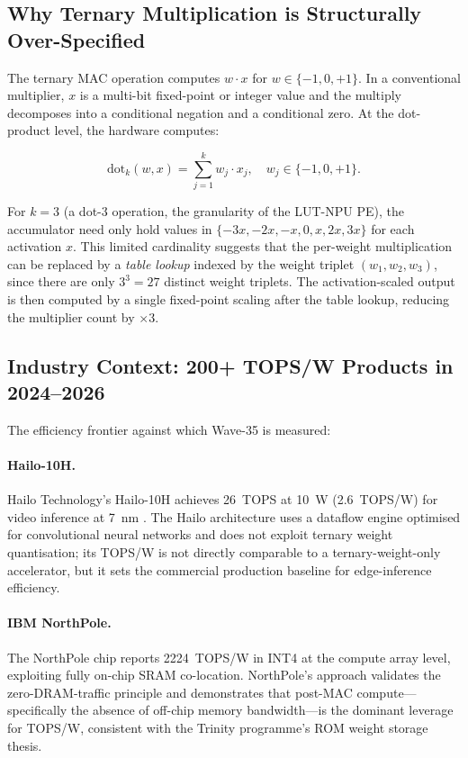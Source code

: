 \subsection{Why Ternary Multiplication is Structurally Over-Specified}

The ternary MAC operation computes $w \cdot x$ for $w \in \{-1,0,+1\}$.
In a conventional multiplier, $x$ is a multi-bit fixed-point or integer value
and the multiply decomposes into a conditional negation and a conditional zero.
At the dot-product level, the hardware computes:

\[
  \text{dot}_k(w, x) = \sum_{j=1}^{k} w_j \cdot x_j, \quad w_j \in \{-1,0,+1\}.
\]

For $k = 3$ (a dot-3 operation, the granularity of the LUT-NPU PE), the
accumulator need only hold values in $\{-3 x, -2 x, -x, 0, x, 2x, 3x\}$ for
each activation $x$.  This limited cardinality suggests that the per-weight
multiplication can be replaced by a \emph{table lookup} indexed by the weight
triplet $(w_1, w_2, w_3)$, since there are only $3^3 = 27$ distinct weight
triplets.  The activation-scaled output is then computed by a single fixed-point
scaling after the table lookup, reducing the multiplier count by $\times 3$.

\subsection{Industry Context: 200+ TOPS/W Products in 2024--2026}

The efficiency frontier against which Wave-35 is measured:

\paragraph{Hailo-10H.}  Hailo Technology's Hailo-10H achieves
26~TOPS at 10~W (2.6~TOPS/W) for video inference at 7~nm \cite{hailo10h_2024}.
The Hailo architecture uses a dataflow engine optimised for convolutional neural
networks and does not exploit ternary weight quantisation; its TOPS/W is not
directly comparable to a ternary-weight-only accelerator, but it sets the
commercial production baseline for edge-inference efficiency.

\paragraph{IBM NorthPole.}  The NorthPole chip \cite{ibm_northpole_2023}
reports 2224~TOPS/W in INT4 at the compute array level, exploiting fully
on-chip SRAM co-location.  NorthPole's approach validates the zero-DRAM-traffic
principle and demonstrates that post-MAC compute—specifically the absence of
off-chip memory bandwidth—is the dominant leverage for TOPS/W, consistent with
the Trinity programme's ROM weight storage thesis.

